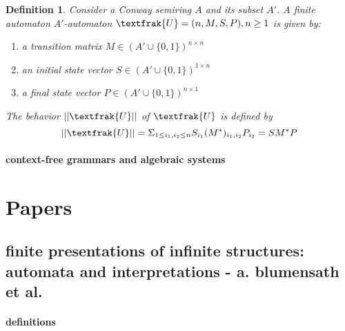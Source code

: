 \documentclass[]{article}
\newtheorem{definition}{Definition}
\begin{document}
\begin{definition}
    Consider a Conway semiring $A$ and its subset $A'$. 
    A finite automaton $A'$-automaton $\textfrak{U}=(n,M,S,P), n \geq 1$ is given by:
    \begin{enumerate}
        \item a transition matrix $M\in (A' \cup \{0,1\})^{n\times n}$
        \item an initial state vector $S\in (A' \cup \{0,1\})^{1\times n}$
        \item a final state vector $P\in (A' \cup \{0,1\})^{n\times 1}$
    \end{enumerate}
    The behavior $||\textfrak{U}||$ of $\textfrak{U}$ is defined by 
    \begin{equation}
        ||\textfrak{U}|| = \Sigma_{1 \leq i_1, i_2 \leq n} S_{i_1} (M^*)_{i_1,i_2} P_{i_2} = S M^* P
    \end{equation}
\end{definition}

\paragraph{context-free grammars and algebraic systems}

\section{Papers}

\subsection{finite presentations of infinite structures: automata and interpretations - a. blumensath et al.}

\paragraph{definitions}
\end{document}
